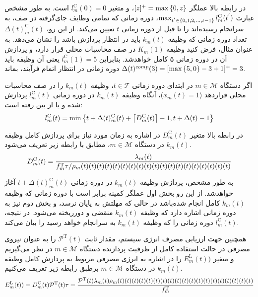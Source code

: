 در رابطه بالا عملگر $[z]^+ = \max \left\{ 0,z \right\}$، و متغیر $l_m^{\text{C}}(0) = 0$ است. به طور مشخص عبارت $\max_{t^{'} \in \left\{ 0,1,2,\ldots, t-1 \right\}}l_m^{\text{C}}(t^{'})$، دوره زمانی که تمامی وظایف جای‌گرفته در صف، به سرانجام رسیده‌اند را تا قبل از دوره زمانی $t$ تعیین می‌کند. از این رو، $\Delta(t)_m^{\text{C}}(t)$ تعداد دوره زمانی که وظیفه $k_m(t)$ باید در انتظار پردازش باشد را نشان می‌دهد. به عنوان مثال، فرض کنید وظیفه $K_m(1)$ در صف محاسبات محلی قرار دارد، و پردازش آن در دوره زمانی ۵ کامل خواهدشد. بنابراین $l_m^{\text{C}}(1) = 5$ یعنی آن وظیفه باید $\Delta(t)^{comp}(3) = [\max \left\{ 5,0 \right\}-3+1]^+ = 3$ دوره زمانی در انتظار اتمام فرآیند، بماند.

اگر دستگاه $m \in \mathcal{M}$  در ابتدای دوره زمانی $t \in \mathcal{T}$، وظیفه $k_m(t)$ را در صف محاسبات محلی قراردهد ($x_m(t) = 1$)، آنگاه وظیفه $k_m(t)$ در دوره زمانی $l_m^{\text{C}}(t)$ پردازش شده و یا از بین رفته است:  
\begin{alignat}{2}
	l_m^{\text{C}}(t) = \min \left\{ t + \Delta(t)_m^{\text{C}}(t) + \left\lceil{D_m^{\text{C}}(t)}\right\rceil - 1, t + \Delta(t) - 1 \right\}
	\label{107}  
\end{alignat}

در رابطه بالا متغیر $D_m^{\text{C}}(t)$ در اشاره به زمان  مورد نیاز برای پردازش کامل وظیفه  $k_m(t)$ در دستگاه $m \in \mathcal{M}$، مطابق با رابطه زیر تعریف می‌شود.
\begin{alignat}{2}
	D_m^{\text{C}}(t) = { \lambda_m(t)  \over  f_m^{\text{T}}  \tau /  \rho_m(t)(t)(t)(t)(t)(t)(t)(t)(t)(t)(t)(t)(t)(t)(t)(t)(t)(t)(t)}
	\label{108}  
\end{alignat}

به طور مشخص، پردازش وظیفه $k_m(t)$ در دوره زمانی $t + \Delta(t)_m^{\text{C}}(t)$ آغاز خواهدشد. از این رو بخش اول عملگر کمینه برابر است با دوره زمانی که وظیفه $k_m(t)$ کامل انجام شده‌باشد در حالی که مهلتش به پایان نرسد، و بخش دوم نیز به دوره زمانی اشاره دارد که وظیفه $k_m(t)$ منقضی و دورریخته می‌شود. در نتیجه، $l_m^{\text{C}}(t)$ دوره زمانی را که وظیفه $k_m(t)$ به سرانجام خواهد رسید را بیان می‌کند. 

همچنین جهت ارزیابی مصرف انرژی سیستم، مقدار ثابت $\mathcal{P}^{\text{T}}(t) $ را به عنوان نیروی مصرفی در حالت استفاده کامل از ظرفیت پردازنده دستگاه $m \in \mathcal{M}$ در نظر می‌گیریم و متغیر $E_m^{\text{L}}(t))$ را در اشاره به انرژی مصرفی مربوط به پردازش کامل وظیفه $k_m(t)$ در دستگاه $m \in \mathcal{M}$ برطبق رابطه زیر تعریف می‌کنیم.
\begin{alignat}{2}
	E_m^{\text{L}}(t)) =  D_m^{\text{C}}(t) \mathcal{P}^{\text{T}}(t)  \tau =  {\mathcal{P}^{\text{T}}(t) \lambda_m(t) \rho_m(t)(t)(t)(t)(t)(t)(t)(t)(t)(t)(t)(t)(t)(t)(t)(t)(t)(t)(t)  \over  f_m^{\text{T}}}
	\label{109}  
\end{alignat}


